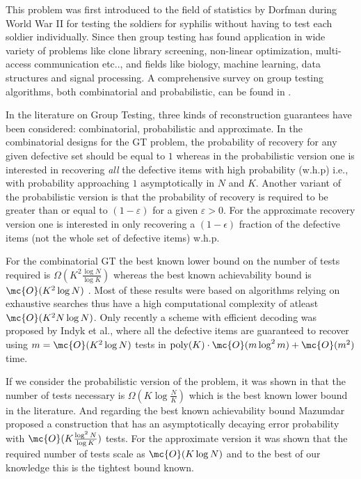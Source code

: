 \documentclass[conference,twocolumn]{IEEEtran}
\begin{document}
This problem was first introduced to the field of statistics by Dorfman \cite{dorfman1943detection} during World War II for testing the soldiers for syphilis without having to test each soldier individually. Since then group testing has found application in wide variety of problems like clone library screening, non-linear optimization, multi-access communication etc.., \cite{du1999combinatorial} and fields like biology\cite{chen2008survey}, machine learning\cite{malioutov2013exact}, data structures\cite{goodrich2005indexing} and signal processing\cite{emad2014poisson}. A comprehensive survey on group testing algorithms, both combinatorial and probabilistic, can be found in \cite{du1999combinatorial,chan2014non,atia2012boolean}. 

In the literature on Group Testing, three kinds of reconstruction guarantees have been considered: combinatorial, probabilistic and approximate. In the combinatorial designs for the GT problem, the probability of recovery for any given defective set should be equal to $1$ whereas in the probabilistic version one is interested in recovering \textit{all} the defective items with high probability (w.h.p) i.e., with probability approaching $1$ asymptotically in $N$ and $K$. Another variant of the probabilistic version is that the probability of recovery is required to be  greater than or equal to $(1-\varepsilon)$ for a given $\varepsilon>0$. For the approximate recovery version one is interested in only recovering a $(1-\epsilon)$ fraction of the defective items (not the whole set of defective items) w.h.p.

For the combinatorial GT the best known lower bound on the number of tests required is $\Omega(K^2\frac{\log N}{\log K})$ \cite{d1982bounds,erdos1985families} whereas the best known achievability bound is $\mc{O}(K^2 \log N)$ \cite{kautz1964nonrandom,porat2011explicit}. Most of these results were based on algorithms relying on exhaustive searches thus have a high computational complexity of atleast $\mc{O}(K^2 N\log N)$. Only recently a scheme with efficient decoding was proposed by Indyk et al., \cite{indyk2010efficiently} where all the defective items are guaranteed to recover using $m=\mc{O}(K^2\log N)$ tests in $\text{poly}(K)\cdot \mc{O}(m \log^2 m )+\mc{O}(m^2)$ time. 

If we consider the probabilistic version of the problem, it was shown in \cite{chan2014non,atia2012boolean} that the number of tests necessary is $\Omega(K\log \frac{N}{K})$ which is the best known lower bound in the literature. And regarding the best known achievability bound Mazumdar \cite{mazumdar2015nonadaptive} proposed a construction that has an asymptotically decaying error probability with $\mc{O}(K\frac{\log^2 N}{\log K})$ tests. For the approximate version it was shown \cite{atia2012boolean} that the required number of tests scale as $\mc{O}(K\log N)$ and to the best of our knowledge this is the tightest bound known.
\end{document}
